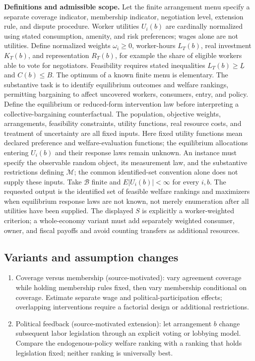 \documentclass[11pt,a4paper]{article}
\begin{document}
\textbf{Definitions and admissible scope.} Let the finite arrangement menu specify a separate coverage indicator, membership indicator, negotiation level, extension rule, and dispute procedure. Worker utilities \(U_i(b)\) are cardinally normalized using stated consumption, amenity, and risk preferences; wages alone are not utilities. Define normalized weights \(\omega_i\ge0\), worker-hours \(L_T(b)\), real investment \(K_T(b)\), and representation \(R_T(b)\), for example the share of eligible workers able to vote for negotiators. Feasibility requires stated inequalities \(L_T(b)\ge\underline L\) and \(C(b)\le B\). The optimum of a known finite menu is elementary. The substantive task is to identify equilibrium outcomes and welfare rankings, permitting bargaining to affect uncovered workers, consumers, entry, and policy. Define the equilibrium or reduced-form intervention law before interpreting a collective-bargaining counterfactual. The population, objective weights, arrangements, feasibility constraints, utility functions, real resource costs, and treatment of uncertainty are all fixed inputs. Here fixed utility functions mean declared preference and welfare-evaluation functions; the equilibrium allocations entering \(U_i(b)\) and their response laws remain unknown. An instance must specify the observable random object, its measurement law, and the substantive restrictions defining \(\mathcal M\); the common identified-set convention alone does not supply these inputs. Take \(\mathcal B\) finite and \(E|U_i(b)|<\infty\) for every \(i,b\). The requested output is the identified set of feasible welfare rankings and maximizers when equilibrium response laws are not known, not merely enumeration after all utilities have been supplied. The displayed \(S\) is explicitly a worker-weighted criterion; a whole-economy variant must add separately weighted consumer, owner, and fiscal payoffs and avoid counting transfers as additional resources.
\subsection*{Variants and assumption changes}
\begin{enumerate}
\item Coverage versus membership (source-motivated): vary agreement coverage while holding membership rules fixed, then vary membership conditional on coverage. Estimate separate wage and political-participation effects; overlapping interventions require a factorial design or additional restrictions.
\item Political feedback (source-motivated extension): let arrangement \(b\) change subsequent labor legislation through an explicit voting or lobbying model. Compare the endogenous-policy welfare ranking with a ranking that holds legislation fixed; neither ranking is universally best.
\end{enumerate}
\end{document}

